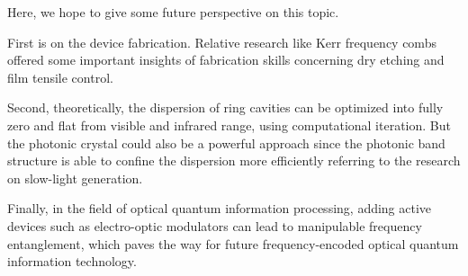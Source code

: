 Here, we hope to give some future perspective on this topic. 

First is on the device fabrication. Relative research like Kerr frequency combs offered some important insights of fabrication skills concerning dry etching and film tensile control. 

Second, theoretically, the dispersion of ring cavities can be optimized into fully zero and flat from visible and infrared range, using computational iteration. But the photonic crystal could also be a powerful approach since the photonic band structure is able to confine the dispersion more efficiently referring to the research on slow-light generation. 

Finally, in the field of optical quantum information processing, adding active devices such as electro-optic modulators can lead to manipulable frequency entanglement, which paves the way for future frequency-encoded optical quantum information technology.